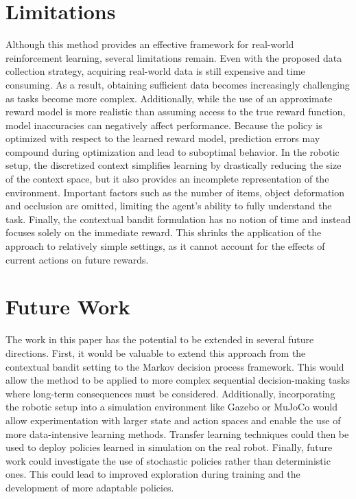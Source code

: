 \documentclass[./dissertation.tex]{subfiles}
\begin{document}
\section{Limitations}
Although this method provides an effective framework for real-world reinforcement learning, several limitations remain. Even with the proposed data collection strategy, acquiring real-world data is still expensive and time consuming. As a result, obtaining sufficient data becomes increasingly challenging as tasks become more complex. Additionally, while the use of an approximate reward model is more realistic than assuming access to the true reward function, model inaccuracies can negatively affect performance. Because the policy is optimized with respect to the learned reward model, prediction errors may compound during optimization and lead to suboptimal behavior. In the robotic setup, the discretized context simplifies learning by drastically reducing the size of the context space, but it also provides an incomplete representation of the environment. Important factors such as the number of items, object deformation and occlusion are omitted, limiting the agent's ability to fully understand the task. Finally, the contextual bandit formulation has no notion of time and instead focuses solely on the immediate reward. This shrinks the application of the approach to relatively simple settings, as it cannot account for the effects of current actions on future rewards.

\section{Future Work}
The work in this paper has the potential to be extended in several future directions. First, it would be valuable to extend this approach from the contextual bandit setting to the Markov decision process framework. This would allow the method to be applied to more complex sequential decision-making tasks where long-term consequences must be considered. Additionally, incorporating the robotic setup into a simulation environment like Gazebo or MuJoCo would allow experimentation with larger state and action spaces and enable the use of more data-intensive learning methods. Transfer learning techniques could then be used to deploy policies learned in simulation on the real robot. Finally, future work could investigate the use of stochastic policies rather than deterministic ones. This could lead to improved exploration during training and the development of more adaptable policies.
\end{document}
